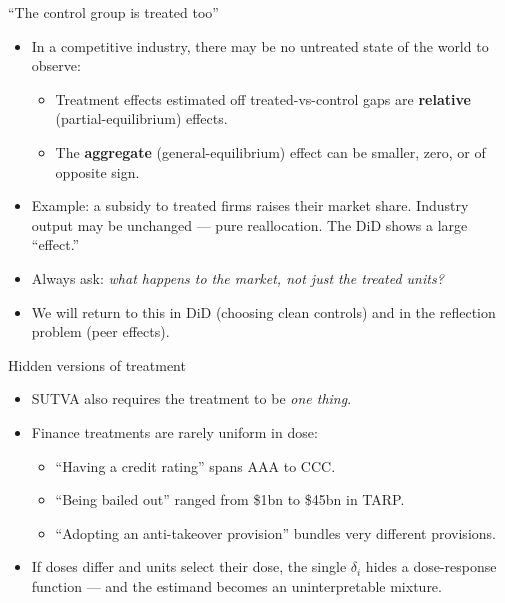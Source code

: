 \documentclass[
  11pt,
  ignorenonframetext,
  aspectratio=169,
]{beamer}
\providecommand{\tightlist}{%
  \setlength{\itemsep}{0pt}\setlength{\parskip}{0pt}}
\begin{document}
\begin{frame}{``The control group is treated too''}
\protect{}\label{the-control-group-is-treated-too}
\begin{itemize}
\tightlist
\item
  In a competitive industry, there may be no untreated state of the
  world to observe:

  \begin{itemize}
  \tightlist
  \item
    Treatment effects estimated off treated-vs-control gaps are
    \textbf{relative} (partial-equilibrium) effects.
  \item
    The \textbf{aggregate} (general-equilibrium) effect can be smaller,
    zero, or of opposite sign.
  \end{itemize}
\item
  Example: a subsidy to treated firms raises their market share.
  Industry output may be unchanged --- pure reallocation. The DiD shows
  a large ``effect.''
\item
  Always ask: \emph{what happens to the market, not just the treated
  units?}
\item
  We will return to this in DiD (choosing clean controls) and in the
  reflection problem (peer effects).
\end{itemize}
\end{frame}

\begin{frame}{Hidden versions of treatment}
\protect{}\label{hidden-versions-of-treatment}
\begin{itemize}
\tightlist
\item
  SUTVA also requires the treatment to be \emph{one thing}.
\item
  Finance treatments are rarely uniform in dose:

  \begin{itemize}
  \tightlist
  \item
    ``Having a credit rating'' spans AAA to CCC.
  \item
    ``Being bailed out'' ranged from \$1bn to \$45bn in TARP.
  \item
    ``Adopting an anti-takeover provision'' bundles very different
    provisions.
  \end{itemize}
\item
  If doses differ and units select their dose, the single \(\delta_i\)
  hides a dose-response function --- and the estimand becomes an
  uninterpretable mixture.
\end{itemize}
\end{frame}
\end{document}
